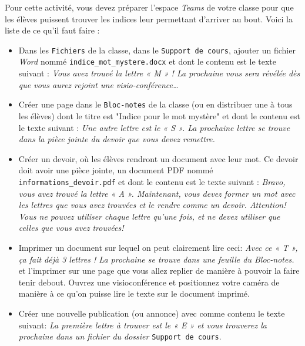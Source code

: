 Pour cette activité, vous devez préparer l’espace \emph{Teams} de votre classe pour que les élèves puissent trouver les indices leur permettant d’arriver au bout. Voici la liste de ce qu’il faut faire :
\begin{itemize}
\item Dans les \texttt{Fichiers} de la classe, dans le \texttt{Support de cours}, ajouter un fichier \emph{Word} nommé \texttt{indice\_mot\_mystere.docx} et dont le contenu est le texte suivant : \emph{Vous avez trouvé la lettre « M » ! La prochaine vous sera révélée dès que vous aurez rejoint une visio-conférence…}

\item Créer une page dans le \texttt{Bloc-notes} de la classe (ou en distribuer une à tous les élèves) dont le titre est "Indice pour le mot mystère" et dont le contenu est le texte suivant : \emph{Une autre lettre est le « S ». La prochaine lettre se trouve dans la pièce jointe du devoir que vous devez remettre.}

\item Créer un devoir, où les élèves rendront un document avec leur mot. Ce devoir doit avoir une pièce jointe, un document PDF nommé \texttt{informations\_devoir.pdf} et dont le contenu est le texte suivant : \emph{Bravo, vous avez trouvé la lettre « A ». Maintenant, vous devez former un mot avec les lettres que vous avez trouvées et le rendre comme un devoir. Attention! Vous ne pouvez utiliser chaque lettre qu'une fois, et ne devez utiliser que celles que vous avez trouvées!}

\item Imprimer un document sur lequel on peut clairement lire ceci: \emph{Avec ce « T », ça fait déjà 3 lettres ! La prochaine se trouve dans une feuille du Bloc-notes.} et l'imprimer sur une page que vous allez replier de manière à pouvoir la faire tenir debout. Ouvrez une visioconférence et positionnez votre caméra de manière à ce qu'on puisse lire le texte sur le document imprimé.

\item Créer une nouvelle publication (ou annonce) avec comme contenu le texte suivant: \emph{La première lettre à trouver est le « E » et vous trouverez la prochaine dans un fichier du dossier} \texttt{Support de cours}.
\end{itemize}





